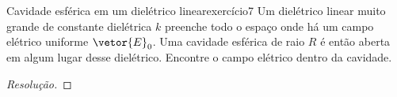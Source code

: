 \begin{exercício}{Cavidade esférica em um dielétrico linear}{exercício7}
    Um dielétrico linear muito grande de constante dielétrica \(k\) preenche todo o espaço onde há um campo elétrico uniforme \(\vetor{E}_0\). Uma cavidade esférica de raio \(R\) é então aberta em algum lugar desse dielétrico. Encontre o campo elétrico dentro da cavidade.
\end{exercício}
\begin{proof}[Resolução]

\end{proof}
